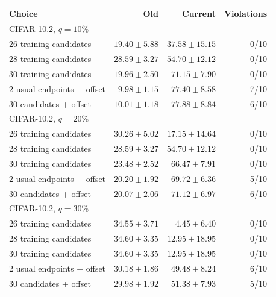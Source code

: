 \begin{tabular}{lrrr}
\toprule
Choice & Old & Current & Violations\\
\midrule
\multicolumn{4}{l}{CIFAR-10.2, $q=10\%$}\\
26 training candidates & $19.40\pm5.88$ & $37.58\pm15.15$ & 0/10\\
28 training candidates & $28.59\pm3.27$ & $54.70\pm12.12$ & 0/10\\
30 training candidates & $19.96\pm2.50$ & $71.15\pm7.90$ & 0/10\\
2 usual endpoints + offset & $9.98\pm1.15$ & $77.40\pm8.58$ & 7/10\\
30 candidates + offset & $10.01\pm1.18$ & $77.88\pm8.84$ & 6/10\\
\multicolumn{4}{l}{CIFAR-10.2, $q=20\%$}\\
26 training candidates & $30.26\pm5.02$ & $17.15\pm14.64$ & 0/10\\
28 training candidates & $28.59\pm3.27$ & $54.70\pm12.12$ & 0/10\\
30 training candidates & $23.48\pm2.52$ & $66.47\pm7.91$ & 0/10\\
2 usual endpoints + offset & $20.20\pm1.92$ & $69.72\pm6.36$ & 5/10\\
30 candidates + offset & $20.07\pm2.06$ & $71.12\pm6.97$ & 6/10\\
\multicolumn{4}{l}{CIFAR-10.2, $q=30\%$}\\
26 training candidates & $34.55\pm3.71$ & $4.45\pm6.40$ & 0/10\\
28 training candidates & $34.60\pm3.35$ & $12.95\pm18.95$ & 0/10\\
30 training candidates & $34.60\pm3.35$ & $12.95\pm18.95$ & 0/10\\
2 usual endpoints + offset & $30.18\pm1.86$ & $49.48\pm8.24$ & 6/10\\
30 candidates + offset & $29.98\pm1.92$ & $51.38\pm7.93$ & 5/10\\
\bottomrule
\end{tabular}
